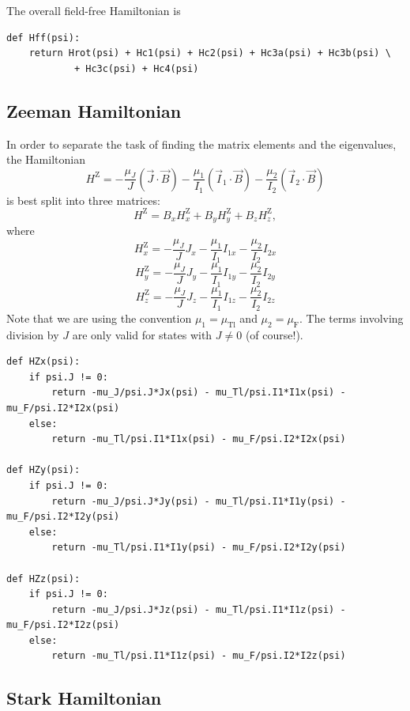 The overall field-free Hamiltonian is

\begin{lstlisting}
def Hff(psi):
    return Hrot(psi) + Hc1(psi) + Hc2(psi) + Hc3a(psi) + Hc3b(psi) \
            + Hc3c(psi) + Hc4(psi)
\end{lstlisting}

\subsection{Zeeman Hamiltonian}

In order to separate the task of finding the matrix elements and the eigenvalues, the Hamiltonian
%
$$H^\text{Z}=-\frac{\mu_J}{J}(\vec J\cdot\vec B)-\frac{\mu_1}{I_1}(\vec I_1\cdot\vec B)-\frac{\mu_2}{I_2}(\vec I_2\cdot\vec B)$$
%
is best split into three matrices:
%
$$H^\text{Z}=B_xH^\text{Z}_x+B_yH^\text{Z}_y+B_zH^\text{Z}_z,$$
%
where
%
$$ H^\text{Z}_x = -\frac{\mu_J}{J}J_x -\frac{\mu_1}{I_1}I_{1x} -\frac{\mu_2}{I_2}I_{2x} $$
$$ H^\text{Z}_y = -\frac{\mu_J}{J}J_y -\frac{\mu_1}{I_1}I_{1y} -\frac{\mu_2}{I_2}I_{2y} $$
$$ H^\text{Z}_z = -\frac{\mu_J}{J}J_z -\frac{\mu_1}{I_1}I_{1z} -\frac{\mu_2}{I_2}I_{2z} $$
%
Note that we are using the convention $\mu_1=\mu_\text{Tl}$ and $\mu_2=\mu_\text{F}$. The terms involving division by $J$ are only valid for states with $J\ne0$ (of course!).

\begin{lstlisting}
def HZx(psi):
    if psi.J != 0:
        return -mu_J/psi.J*Jx(psi) - mu_Tl/psi.I1*I1x(psi) - mu_F/psi.I2*I2x(psi)
    else:
        return -mu_Tl/psi.I1*I1x(psi) - mu_F/psi.I2*I2x(psi)

def HZy(psi):
    if psi.J != 0:
        return -mu_J/psi.J*Jy(psi) - mu_Tl/psi.I1*I1y(psi) - mu_F/psi.I2*I2y(psi)
    else:
        return -mu_Tl/psi.I1*I1y(psi) - mu_F/psi.I2*I2y(psi)
    
def HZz(psi):
    if psi.J != 0:
        return -mu_J/psi.J*Jz(psi) - mu_Tl/psi.I1*I1z(psi) - mu_F/psi.I2*I2z(psi)
    else:
        return -mu_Tl/psi.I1*I1z(psi) - mu_F/psi.I2*I2z(psi)
\end{lstlisting}

\subsection{Stark Hamiltonian}

